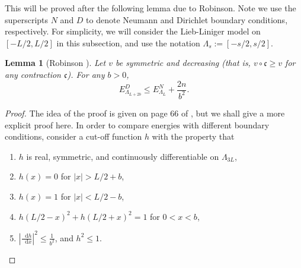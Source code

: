 \documentclass[a4paper,11pt]{article}
\newcommand{\abs}[1]{\left\lvert #1 \right\rvert}
\newcommand*\diff{\mathop{}\!\mathrm{d}}
\newtheorem{lemma}[theorem]{Lemma}
\numberwithin{equation}{section}
\begin{document}
	This will be proved after the following lemma due to Robinson. Note we use the superscripts $N$ and $D$ to denote Neumann and Dirichlet boundary conditions, respectively. For simplicity, we will consider the Lieb-Liniger model on $[-L/2,L/2]$ in this subsection, and use the notation $\Lambda_s:=[-s/2,s/2]$.
	\begin{lemma}[Robinson \cite{robinson2014thermodynamic}]\label{LemmaRobinson}
		Let $ v$ be symmetric and decreasing (that is, $ v\circ \mathfrak{c}\geq v $ for any contraction $ \mathfrak{c} $). For any $ b>0 $,  \begin{equation}\label{EqRobinsonBound}
			E^D_{\Lambda_{L+2b}}\leq E^N_{\Lambda_L}+\frac{2n}{b^2}.
		\end{equation}
	\end{lemma}
	\begin{proof}
		The idea of the proof is given on page 66 of \cite{robinson2014thermodynamic}, but we shall give a more explicit proof here. In order to compare energies with different boundary conditions, consider a cut-off function $ h $ with the property that
		\begin{enumerate}
			\item $ h $ is real, symmetric, and continuously differentiable on $ \Lambda_{3L} $,
			\item $ h(x)=0 $ for $ \abs{x}>L/2+b $,
			\item $ h(x)=1 $ for $ \abs{x}<L/2-b $,
			\item $ h(L/2-x)^2+h(L/2+x)^2=1 $ for $ 0<x<b $,
			\item $ \abs{\frac{\diff h}{\diff x}}^2\leq \frac{1}{b^2} $, and $ h^2\leq 1 $.
		\end{enumerate}
		

\end{proof}
\end{document}
